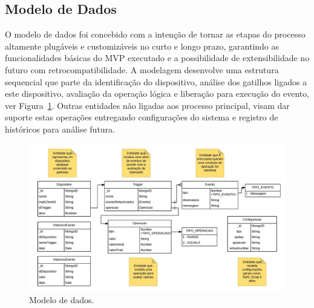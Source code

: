 \subsection{Modelo de Dados}
O modelo de dados foi concebido com a intenção de tornar as etapas do processo altamente plugáveis e customizáveis no curto e longo prazo, garantindo as funcionalidades básicas do MVP executado e a possibilidade de extensibilidade no futuro com retrocompatibilidade.
A modelagem desenvolve uma estrutura sequencial que parte da identificação do dispositivo, análise dos gatilhos ligados a este dispositivo, avaliação da operação lógica e liberação para execução do evento, ver Figura~\ref{fig:modeloDeDados}. Outras entidades não ligadas aos processo principal, visam dar suporte estas operações entregando configurações do sistema e registro de históricos para análise futura. \begin{figure}[h!]
	\begin{center}
		\includegraphics[width=1\textwidth]{./img/modelo-de-dados}
		\caption{Modelo de dados.}
		\label{fig:modeloDeDados}
	\end{center}
\end{figure}
